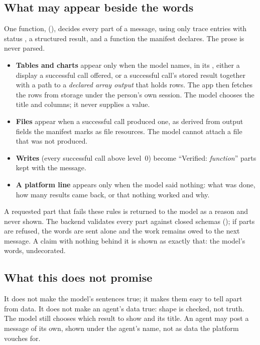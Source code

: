 \subsection{What may appear beside the words}

One function,  (),
decides every part of a message, using only trace entries with status
, a structured result, and a function the manifest
declares. The prose is never parsed.

\begin{itemize}
\item \textbf{Tables and charts} appear only when the model names, in
  its , either a display a successful call offered, or a
  successful call's stored result together with a path to a
  \emph{declared array output} that holds rows. The app then fetches the
  rows from storage under the person's own session. The model chooses
  the title and columns; it never supplies a value.
\item \textbf{Files} appear when a successful call produced one, as
  derived from output fields the manifest marks as file resources. The
  model cannot attach a file that was not produced.
\item \textbf{Writes} (every successful call above level~0) become
  ``Verified: \emph{function}'' parts kept with the message.
\item \textbf{A platform line} appears only when the model said nothing:
  what was done, how many results came back, or that nothing worked and
  why.
\end{itemize}

\noindent A requested part that fails these rules is returned to the
model as a reason and never shown. The backend validates every part
against closed schemas (); if parts are
refused, the words are sent alone and the work remains owed to the next
message. A claim with nothing behind it is shown as exactly that: the
model's words, undecorated.

\subsection{What this does not promise}

It does not make the model's sentences true; it makes them easy to tell
apart from data. It does not make an agent's data true: shape is
checked, not truth. The model still chooses which result to show and
its title. An agent may post a message of its own, shown under the
agent's name, not as data the platform vouches for.

